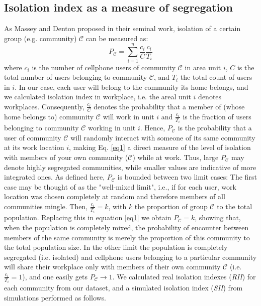 \documentclass[%
preprint,
 amsmath,amssymb,
pra,
]{revtex4-1}
\begin{document}
\subsection{Isolation index as a measure of segregation} \label{II}
As Massey and Denton \cite{massey1988dimensions} proposed in their seminal work, isolation of a certain group (e.g. community) $\mathscr C$ can be measured as:
\begin{equation}
P_\mathscr C=\sum_{i=1}^{n} \frac{c_i}{C}  \frac{c_i}{T_i}%
\label{eq1}
\end{equation}                                           
where $c_i$ is the number of cellphone users of community $\mathscr C$ in area unit $i$, $C$ is the total number of users belonging to community $\mathscr C$, and $T_i$ the total count of users in $i$. In our case, each user will belong to the community its home belongs, and we calculated isolation index in workplace, i.e. the areal unit $i$ denotes workplaces. Consequently, $\frac{c_i}{C}$ denotes the probability that a member of (whose home belongs to) community $\mathscr C$ will work in unit $i$ and $\frac{c_i}{T_i}$ is the fraction of users belonging to community $\mathscr C$ working in unit $i$. Hence, $P_{\mathscr C}$ is the probability that a user of community $\mathscr C$ will randomly interact with someone of its same community at its work location $i$, making Eq. \ref{eq1} a direct measure of the level of isolation with members of your own community ($\mathscr C$) while at work. Thus, large $P_{\mathscr C}$ may denote highly segregated communities, while smaller values are indicative of more integrated ones. As defined here,  $P_\mathscr C$ is bounded between two limit cases: The first case may be thought of as the "well-mixed limit", i.e., if for each user, work location was chosen completely at random and therefore members of all communities mingle. Then, $\frac{c_i}{T_i}=k$, with  $k$ the proportion of group $\mathscr C$ to the total population. Replacing this in equation \ref{eq1} we obtain $P_\mathscr C=k$, showing that, when the population is completely mixed, the probability of encounter between members of the same community is merely the proportion of this community to the total population size. In the other limit the population is completely segregated (i.e. isolated) and cellphone users belonging to a particular community will share their workplace only with members of their own community $\mathscr C$ (i.e. $\frac{c_i}{T_i}=1$), and one easily gets $P_\mathscr C \rightarrow 1$. We calculated real isolation indexes (\emph{RII}) for each community from our dataset, and a simulated isolation index (\emph{SII}) from simulations performed as follows. 
\end{document}
